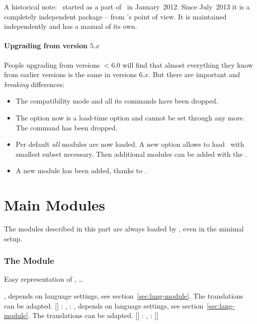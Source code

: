 \documentclass{chemmacros-manual}
\begin{document}
A historical note: \chemformula\ started as a part of \chemmacros\ in
January~2012.  Since July~2013 it is a completely independent package -- from
\chemformula's point of view.  It is maintained independently and has a manual
of its own.

\subsection{Upgrading from version $5.x$}
People upgrading from versions $<6.0$ will find that almost everything they
know from earlier versions is the same in versions $6.x$.  But there are
important and \emph{breaking} differences:
\begin{itemize}
  \item The compatibility mode and all its commands have been dropped.
  \item The option  now is a load-time option and cannot be
    set through  any more.  The command  has
    been dropped.
  \item Per default \emph{all} modules are now loaded.  A new option
     allows to load \chemmacros\ with smallest subset
    necessary. Then additional modules can be added with the
    .
  \item A new module  has been added, thanks to \leandriis.
\end{itemize}

\part{Main Modules}\label{part:main-modules}

The modules described in this part are always loaded by \chemmacros, even in
the minimal setup.

\section{The  Module}\label{sec:acid-base-module}

Easy representation of \pH, \pKa \ldots
\begin{commands}
   \pH
   \pOH
   \Ka, depends on language settings, see
    section~\vref{sec:lang-module}.  The translations can be adapted.
   \Kb
   \Kw
  [] : \pKa, : \pKa[1], depends
    on language settings, see  section~\vref{sec:lang-module}.  The translations
    can be adapted.
  [] : \pKb, : \pKb[1]
  [] \eg\  \p{\Kw}
\end{commands}
\end{document}
